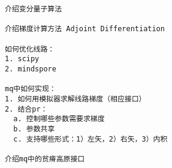 \begin{lstlisting}
介绍变分量子算法

介绍梯度计算方法 Adjoint Differentiation

如何优化线路：
1. scipy
2. mindspore

mq中如何实现：
1. 如何用模拟器求解线路梯度（相应接口）
2. 结合pr：
  a. 控制哪些参数需要求梯度
  b. 参数共享
  c. 支持哪些形式：1）左矢，2）右矢，3）内积

介绍mq中的贫瘠高原接口
\end{lstlisting}